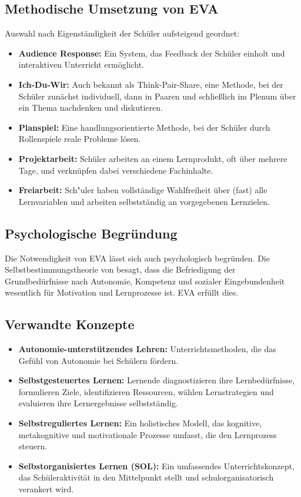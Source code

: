 \subsection{Methodische Umsetzung von EVA}
Auswahl nach Eigenst\"andigkeit der Sch\"uler aufsteigend geordnet:
\begin{itemize}
	\item \textbf{Audience Response:} Ein System, das Feedback der Sch\"uler einholt und interaktiven Unterricht erm\"oglicht.
	\item  \textbf{Ich-Du-Wir:} Auch bekannt als \glqq Think-Pair-Share\grqq, eine Methode, bei der Sch\"uler zunächst individuell, dann in Paaren und schlie\ss lich im Plenum über ein Thema nachdenken und diskutieren.
	\item \textbf{Planspiel:} Eine handlungsorientierte Methode, bei der Sch\"uler durch Rollenspiele reale Probleme l\"osen.
	\item \textbf{Projektarbeit:} Sch\"uler arbeiten an einem Lernprodukt, oft \"uber mehrere Tage, und verkn\"upfen dabei verschiedene Fachinhalte.
	\item \textbf{Freiarbeit:} Sch"uler haben vollst\"andige Wahlfreiheit \"uber (fast) alle Lernvariablen und arbeiten selbstst\"andig an vorgegebenen Lernzielen.
\end{itemize}

\subsection{Psychologische Begr\"undung}
Die Notwendigkeit von EVA l\"asst sich auch psychologisch begr\"unden. Die Selbstbestimmungstheorie von \textcite{DeciRyan} besagt, dass die Befriedigung der Grundbed\"urfnisse nach Autonomie, Kompetenz und sozialer Eingebundenheit wesentlich f\"ur Motivation und Lernprozesse ist. EVA erf\"ullt dies.

\subsection{Verwandte Konzepte}
\begin{itemize}
	\item \textbf{Autonomie-unterst\"utzendes Lehren:} Unterrichtsmethoden, die das Gef\"uhl von Autonomie bei Sch\"ulern f\"ordern.
	\item \textbf{Selbstgesteuertes Lernen:} Lernende diagnostizieren ihre Lernbed\"urfnisse, formulieren Ziele, identifizieren Ressourcen, w\"ahlen Lernstrategien und evaluieren ihre Lernergebnisse selbstst\"andig.
	\item \textbf{Selbstreguliertes Lernen:} Ein holistisches Modell, das kognitive, metakognitive und motivationale Prozesse umfasst, die den Lernprozess steuern.
	\item \textbf{Selbstorganisiertes Lernen (SOL):} Ein umfassendes Unterrichtskonzept, das Sch\"uleraktivit\"at in den Mittelpunkt stellt und schulorganisatorisch verankert wird.
\end{itemize}

